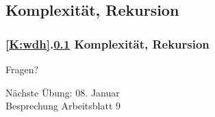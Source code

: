 \documentclass[c,18pt]{beamer}
\begin{document}
\def\stitle{Komplexit\"at, Rekursion}
\subsection{\stitle}\label{S:Rek}
\begin{frame}[t]%
  \frametitle{\ref{K:wdh}.\ref{S:Rek} \stitle}
\medskip


\end{frame}


\setcounter{exercise}{30}

\setcounter{exercise}{31}

\setcounter{exercise}{32}



\begin{frame}
\centering
\Huge\textcolor{KITgreen}{Fragen?}
\vspace{2cm}

{\LARGE
N\"achste \"Ubung: 08. Januar\\
Besprechung Arbeitsblatt 9
}
\end{frame}


\end{document}
